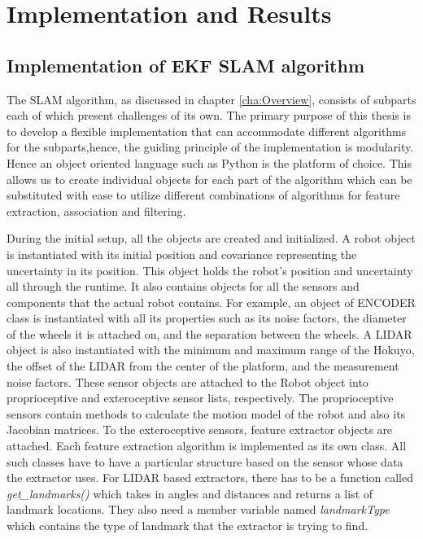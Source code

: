 \chapter{Implementation and Results}
\label{cha:results}

\section{Implementation of EKF SLAM algorithm}
\label{sec:slam_process}
The SLAM algorithm, as discussed in chapter \ref{cha:Overview}, consists of subparts each of which present challenges of its own. The primary purpose of this thesis is to develop a flexible implementation that can accommodate different algorithms for the subparts,hence, the guiding principle of the implementation is modularity. Hence an object oriented language such as Python is the platform of choice. This allows us to create individual objects for each part of the algorithm which can be substituted with ease to utilize different combinations of algorithms for feature extraction, association and filtering. 

During the initial setup, all the objects are created and initialized. A robot object is instantiated with its initial position and covariance representing the uncertainty in its position. This object holds the robot's position and uncertainty all through the runtime. It also contains objects for all the sensors and components that the actual robot contains. For example, an object of ENCODER class is instantiated with all its properties such as its noise factors, the diameter of the wheels it is attached on, and the separation between the wheels. A LIDAR object is also instantiated with the minimum and maximum range of the Hokuyo, the offset of the LIDAR from the center of the platform, and the measurement noise factors. These sensor objects are attached to the Robot object into proprioceptive and exteroceptive sensor lists, respectively. The proprioceptive sensors contain methods to calculate the motion model of the robot and also its Jacobian matrices.
To the exteroceptive sensors, feature extractor objects are attached. Each feature extraction algorithm is implemented as its own class. All such classes have to have a particular structure based on the sensor whose data the extractor uses. For LIDAR based extractors,  there has to be a function called \textit{get\_landmarks()} which takes in angles and distances and returns a list of landmark locations. They also need a member variable named \textit{landmarkType} which contains the type of landmark that the extractor is trying to find. 

